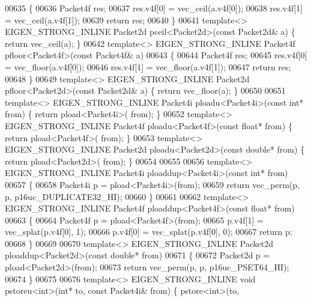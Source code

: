 \begin{DoxyCode}
{00635 \{
00636   Packet4f res;
00637   res.v4f[0] = vec\_ceil(a.v4f[0]);
00638   res.v4f[1] = vec\_ceil(a.v4f[1]);
00639   \textcolor{keywordflow}{return} res;
00640 \}
00641 \textcolor{keyword}{template}<> EIGEN\_STRONG\_INLINE Packet2d pceil<Packet2d>(\textcolor{keyword}{const}  Packet2d& a) \{ \textcolor{keywordflow}{return} vec\_ceil(a); \}
00642 \textcolor{keyword}{template}<> EIGEN\_STRONG\_INLINE Packet4f pfloor<Packet4f>(\textcolor{keyword}{const} Packet4f& a)
00643 \{
00644   Packet4f res;
00645   res.v4f[0] = vec\_floor(a.v4f[0]);
00646   res.v4f[1] = vec\_floor(a.v4f[1]);
00647   \textcolor{keywordflow}{return} res;
00648 \}
00649 \textcolor{keyword}{template}<> EIGEN\_STRONG\_INLINE Packet2d pfloor<Packet2d>(\textcolor{keyword}{const} Packet2d& a) \{ \textcolor{keywordflow}{return} vec\_floor(a); \}
00650 
00651 \textcolor{keyword}{template}<> EIGEN\_STRONG\_INLINE Packet4i ploadu<Packet4i>(\textcolor{keyword}{const} \textcolor{keywordtype}{int}*       from) \{ \textcolor{keywordflow}{return} pload<Packet4i>(
      from); \}
00652 \textcolor{keyword}{template}<> EIGEN\_STRONG\_INLINE Packet4f ploadu<Packet4f>(\textcolor{keyword}{const} \textcolor{keywordtype}{float}*     from) \{ \textcolor{keywordflow}{return} pload<Packet4f>(
      from); \}
00653 \textcolor{keyword}{template}<> EIGEN\_STRONG\_INLINE Packet2d ploadu<Packet2d>(\textcolor{keyword}{const} \textcolor{keywordtype}{double}*    from) \{ \textcolor{keywordflow}{return} pload<Packet2d>(
      from); \}
00654 
00655 
00656 \textcolor{keyword}{template}<> EIGEN\_STRONG\_INLINE Packet4i ploaddup<Packet4i>(\textcolor{keyword}{const} \textcolor{keywordtype}{int}*     from)
00657 \{
00658   Packet4i p = pload<Packet4i>(from);
00659   \textcolor{keywordflow}{return} vec\_perm(p, p, p16uc\_DUPLICATE32\_HI);
00660 \}
00661 
00662 \textcolor{keyword}{template}<> EIGEN\_STRONG\_INLINE Packet4f ploaddup<Packet4f>(\textcolor{keyword}{const} \textcolor{keywordtype}{float}*    from)
00663 \{
00664   Packet4f p = pload<Packet4f>(from);
00665   p.v4f[1] = vec\_splat(p.v4f[0], 1);
00666   p.v4f[0] = vec\_splat(p.v4f[0], 0);
00667   \textcolor{keywordflow}{return} p;
00668 \}
00669 
00670 \textcolor{keyword}{template}<> EIGEN\_STRONG\_INLINE Packet2d ploaddup<Packet2d>(\textcolor{keyword}{const} \textcolor{keywordtype}{double}*   from)
00671 \{
00672   Packet2d p = pload<Packet2d>(from);
00673   \textcolor{keywordflow}{return} vec\_perm(p, p, p16uc\_PSET64\_HI);
00674 \}
00675 
00676 \textcolor{keyword}{template}<> EIGEN\_STRONG\_INLINE \textcolor{keywordtype}{void} pstoreu<int>(\textcolor{keywordtype}{int}*        to, \textcolor{keyword}{const} Packet4i& from) \{ pstore<int>(to, 
}
\end{DoxyCode}

